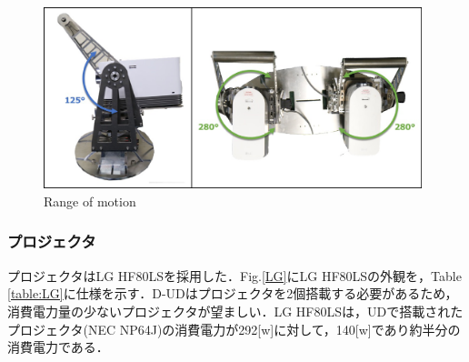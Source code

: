 \documentclass[12pt]{sonota/aislab}
\begin{document}
\begin{figure}[h]
\begin{center}
\includegraphics[clip, width=11cm]{figs/angle_limit.eps}
\caption{Range of motion}
\label{pantilt_range_limit}
\end{center}
\end{figure}

\subsubsection{プロジェクタ}
プロジェクタはLG HF80LSを採用した．Fig.\ref{LG}にLG HF80LSの外観を，Table \ref{table:LG}に仕様を示す．D-UDはプロジェクタを2個搭載する必要があるため，消費電力量の少ないプロジェクタが望ましい．LG HF80LSは，UDで搭載されたプロジェクタ(NEC NP64J)の消費電力が292[w]に対して，140[w]であり約半分の消費電力である．

\end{document}
